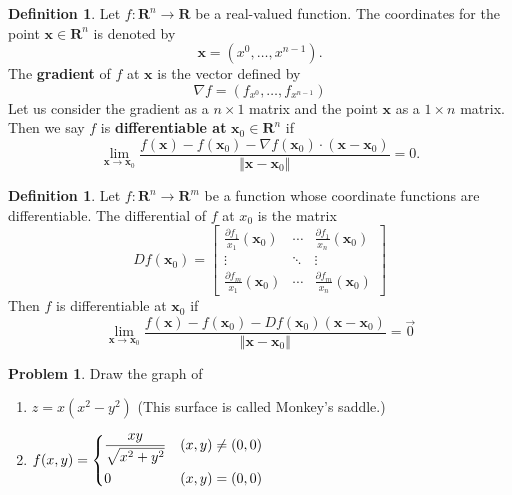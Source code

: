 \documentclass[t]{beamer}
\theoremstyle{plain}
\theoremstyle{definition}
\newtheorem{defn}[thm]{Definition}
\newtheorem{prob}[thm]{Problem}
\begin{document}
\begin{frame}
\begin{defn}
Let $f:\mathbf R^n\to\mathbf R$ be a real-valued function.
The coordinates for the point $\mathbf x\in \mathbf R^n$ is denoted by 
\[\mathbf x = (x^{0}, \ldots, x^{n-1}).\]
The \textbf{gradient} of $f$ at $\mathbf x$ is the vector defined by
	\[ \nabla f = (f_{x^{0}}, \ldots, f_{x^{n-1}}) \]
Let us consider the gradient as a $n\times 1$ matrix
and the point $\mathbf x$ as a $1\times n$ matrix.
Then we say $f$ is \textbf{differentiable at} $\mathbf x_0\in\mathbf R^n$ if 
\[\lim_{\mathbf x\to\mathbf x_0}
	\frac{f(\mathbf x) - f(\mathbf x_0) 
	- \nabla f(\mathbf x_0)
	\cdot(\mathbf x-\mathbf x_0)}
	{\Vert\mathbf x-\mathbf x_0\Vert} = 0.\]
\end{defn}
\end{frame}

\begin{frame}
\begin{defn}
	Let $f:\mathbf R^n\to\mathbf R^m$ be a function
	whose coordinate functions are differentiable.
	The differential of $f$ at $x_0$ is the matrix
	$$Df(\mathbf x_0)
	 = \begin{bmatrix} 
	\frac{\partial f_1}{x_1}(\mathbf x_0) & \cdots 
		& \frac{\partial f_1}{x_n}(\mathbf x_0) \\
	\vdots & \ddots & \vdots \\
	\frac{\partial f_m}{x_1}(\mathbf x_0) & \cdots
		& \frac{\partial f_m}{x_n}(\mathbf x_0) 
	   \end{bmatrix}$$
	Then $f$ is differentiable at $\mathbf x_0$ if
	$$\lim_{\mathbf x\to\mathbf x_0}
	\frac{f(\mathbf x) - f(\mathbf x_0) 
	- Df(\mathbf x_0)
	(\mathbf x - \mathbf x_0)}
	{\Vert \mathbf x - \mathbf x_0\Vert} = \vec 0$$
\end{defn}	
\end{frame}

\begin{frame}
\begin{prob}
	Draw the graph of 
	\begin{enumerate}
	\item $z = x(x^2-y^2)$ 
	(This surface is called Monkey's saddle.)
	\item $f(x,y)=\begin{dcases}
	\frac{xy}{\sqrt{x^2+y^2}} & (x,y)\neq(0,0)\\
	0 & (x,y)=(0,0)\end{dcases}$
	\end{enumerate}
\end{prob}
\end{frame}
\end{document}
